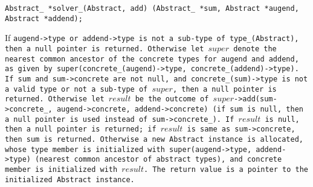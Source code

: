 
\tt{Abstract_ *solver_(Abstract, add)%
(Abstract_ *sum, Abstract *augend, Abstract *addend);}


If \tt{augend->type} or \tt{addend->type} is not a sub-type
of \tt{type_(Abstract)}, then a null pointer is returned.
Otherwise let $super$ denote the nearest common ancestor of the
concrete types for \tt{augend} and \tt{addend}, as given by
\tt{super(concrete_(augend)->type, concrete_(addend)->type)}.
If \tt{sum} and \tt{sum->concrete} are not null, and \tt{concrete_(sum)->type} is
not a valid type or not a sub-type of $super$, then a null pointer is returned.
Otherwise let $result$ be the outcome of
$super$\tt{->add(sum->concrete_, augend->concrete, addend->concrete)}
(if \tt{sum} is null, then a null pointer is used instead of \tt{sum->concrete_}).
If $result$ is null, then a null pointer is returned;
if $result$ is same as \tt{sum->concrete}, then \tt{sum} is returned.
Otherwise a new \tt{Abstract} instance is allocated, whose \tt{type} member is
initialized with \tt{super(augend->type, addend->type)} (nearest common ancestor
of abstract types), and \tt{concrete} member is initialized with $result$.
The return value is a pointer to the initialized \tt{Abstract} instance.
